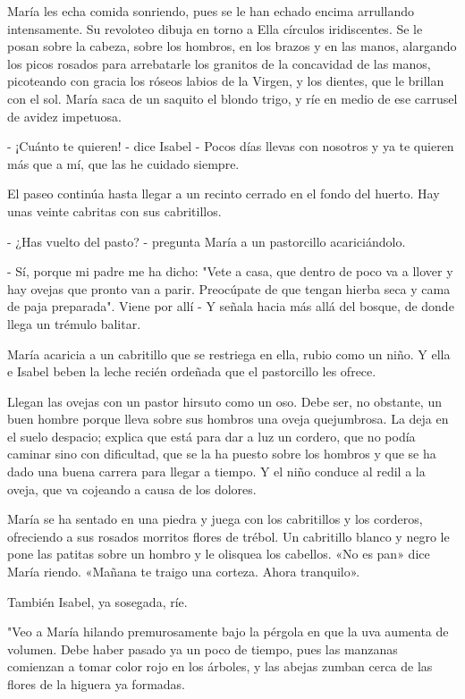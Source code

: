 \documentclass[12pt, twoside, openright]{book} %
\begin{document}
María les echa comida sonriendo, pues se le han echado encima arrullando intensamente. Su revoloteo dibuja en torno a Ella círculos iridiscentes. Se le posan sobre la cabeza, sobre los hombros, en los brazos y en las manos, alargando los picos rosados para arrebatarle los granitos de la concavidad de las manos, picoteando con gracia los róseos labios de la Virgen, y los dientes, que le brillan con el sol. María saca de un saquito el blondo trigo, y ríe en medio de ese carrusel de avidez impetuosa. 

- ¡Cuánto te quieren! - dice Isabel - Pocos días llevas con nosotros y ya te quieren más que a mí, que las he cuidado siempre. 

El paseo continúa hasta llegar a un recinto cerrado en el fondo del huerto. Hay unas veinte cabritas con sus cabritillos. 

- ¿Has vuelto del pasto? - pregunta María a un pastorcillo acariciándolo. 

- Sí, porque mi padre me ha dicho: "Vete a casa, que dentro de poco va a llover y hay ovejas que pronto van a parir. Preocúpate de que tengan hierba seca y cama de paja preparada". Viene por allí - Y señala hacia más allá del bosque, de donde llega un trémulo balitar. 

María acaricia a un cabritillo que se restriega en ella, rubio como un niño. Y ella e Isabel beben la leche recién ordeñada que el pastorcillo les ofrece. 

Llegan las ovejas con un pastor hirsuto como un oso. Debe ser, no obstante, un buen hombre porque lleva sobre sus hombros una oveja quejumbrosa. La deja en el suelo despacio; explica que está para dar a luz un cordero, que no podía caminar sino con dificultad, que se la ha puesto sobre los hombros y que se ha dado una buena carrera para llegar a tiempo. Y el niño conduce al redil a la oveja, que va cojeando a causa de los dolores. 

María se ha sentado en una piedra y juega con los cabritillos y los corderos, ofreciendo a sus rosados morritos flores de trébol. Un cabritillo blanco y negro le pone las patitas sobre un hombro y le olisquea los cabellos. «No es pan» dice María riendo. «Mañana te traigo una corteza. Ahora tranquilo». 

También Isabel, ya sosegada, ríe. 

"Veo a María hilando premurosamente bajo la pérgola en que la uva aumenta de volumen. Debe haber pasado ya un poco de tiempo, pues las manzanas comienzan a tomar color rojo en los árboles, y las abejas zumban cerca de las flores de la higuera ya formadas. 
\end{document}
